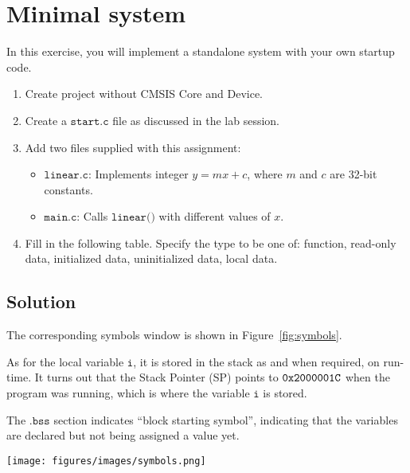 \section*{Minimal system}

In this exercise, you will implement a standalone system with your own startup code.

\begin{enumerate}[itemsep=0pt]
    \item Create project without CMSIS Core and Device.
    \item Create a \(\texttt{start.c}\) file as discussed in the lab session.
    \item Add two files supplied with this assignment:
          \begin{itemize}
              \item \(\texttt{linear.c}\): Implements integer \(y = mx + c\), where \(m\) and \(c\) are 32-bit constants.
              \item \(\texttt{main.c}\): Calls \(\texttt{linear()}\) with diﬀerent values of \(x\).
          \end{itemize}
    \item Fill in the following table.
          Specify the type to be one of:
          function, read-only data, initialized data, uninitialized data, local data.
\end{enumerate}

\subsection*{Solution}

\begin{table}[htbp]
    \centering
    
\end{table}

The corresponding symbols window is shown in Figure~\ref{fig:symbols}.

\newpage
As for the local variable \( \texttt{i} \), it is stored in the stack as and when required, on run-time.
It turns out that the Stack Pointer (SP) points to \( \texttt{0x2000001C} \) when the program was running, which is where the variable \( \texttt{i} \) is stored.

The \( \texttt{.bss} \) section indicates ``block starting symbol'', indicating that the variables are declared but not being assigned a value yet.

\vspace*{3em}
\begin{figure*}[h]
    \centering
    \texttt{[image: figures/images/symbols.png]}
    \caption{
        Symbols window
    }\label{fig:symbols}
\end{figure*}

